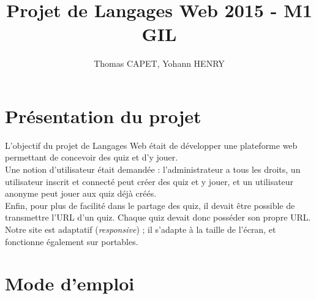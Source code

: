 \documentclass[12pt,titlepage]{article}
\title{Projet de Langages Web 2015 - M1 GIL}
\author{Thomas CAPET, Yohann HENRY}
\begin{document}
\maketitle
\newpage

\tableofcontents
\newpage

\section{Présentation du projet}

L'objectif du projet de Langages Web était de développer une plateforme web permettant de concevoir des quiz et d'y jouer.\\
Une notion d'utilisateur était demandée : l'administrateur a tous les droits, un utilisateur inscrit et connecté peut créer des quiz et y jouer, et un utilisateur anonyme peut jouer aux quiz déjà créés.\\
Enfin, pour plus de facilité dans le partage des quiz, il devait être possible de transmettre l'URL d'un quiz. Chaque quiz devait donc posséder son propre URL.
\medbreak
Notre site est adaptatif (\textit{responsive}) ; il s'adapte à la taille de l'écran, et fonctionne également sur portables.

\section{Mode d'emploi}
\end{document}
